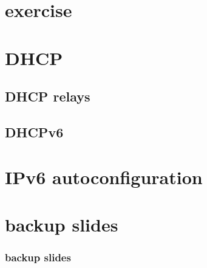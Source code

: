 


\section{exercise}


\section{DHCP}


\subsection{DHCP relays}


\subsection{DHCPv6}


\section{IPv6 autoconfiguration}





\section{backup slides}
\begin{frame}\frametitle{backup slides}
\end{frame}





